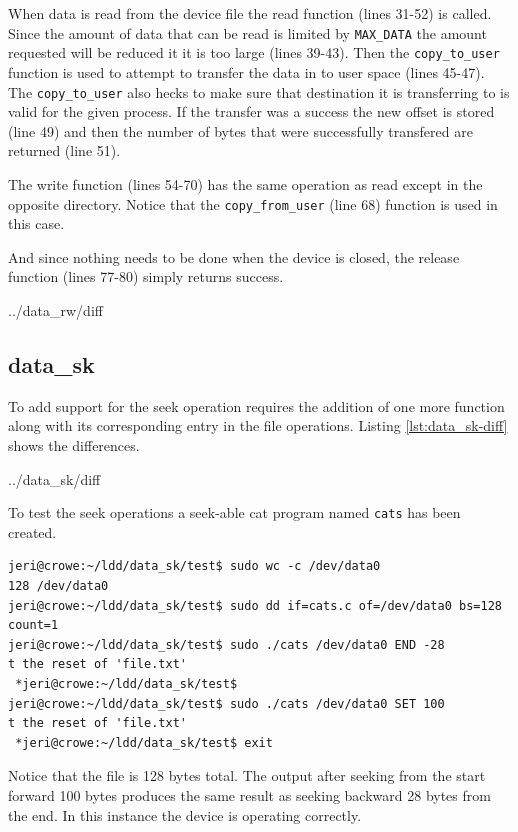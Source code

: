 \documentclass{article}
\begin{document}
When data is read from the device file the read function (lines 31-52)
is called.
Since the amount of data that can be read is limited by \verb+MAX_DATA+
the amount requested will be reduced it it is too large (lines 39-43).
Then the \verb+copy_to_user+ function is used to attempt to transfer
the data in to user space (lines 45-47).
The \verb+copy_to_user+ also hecks to make sure that destination it is
transferring to is valid for the given process.
If the transfer was a success the new offset is stored (line 49)
and then the number of bytes that were successfully transfered are
returned (line 51).

The write function (lines 54-70) has the same operation as read
except in the opposite directory.
Notice that the \verb+copy_from_user+ (line 68) function is used
in this case.

And since nothing needs to be done when the device is closed,
the release function (lines 77-80) simply returns success.

\pagebreak

	{../data_rw/diff}


\subsection{data\_sk}

To add support for the seek operation requires the addition of
one more function along with its corresponding entry in the
file operations.  Listing \ref{lst:data_sk-diff} shows the
differences.


	{../data_sk/diff}

To test the seek operations a seek-able cat program named \verb+cats+
has been created.

\begin{verbatim}
jeri@crowe:~/ldd/data_sk/test$ sudo wc -c /dev/data0
128 /dev/data0
jeri@crowe:~/ldd/data_sk/test$ sudo dd if=cats.c of=/dev/data0 bs=128 count=1
jeri@crowe:~/ldd/data_sk/test$ sudo ./cats /dev/data0 END -28
t the reset of 'file.txt'
 *jeri@crowe:~/ldd/data_sk/test$ 
jeri@crowe:~/ldd/data_sk/test$ sudo ./cats /dev/data0 SET 100
t the reset of 'file.txt'
 *jeri@crowe:~/ldd/data_sk/test$ exit
\end{verbatim}

Notice that the file is 128 bytes total.
The output after seeking from the start forward 100 bytes produces
the same result as seeking backward 28 bytes from the end.
In this instance the device is operating correctly.
\end{document}

